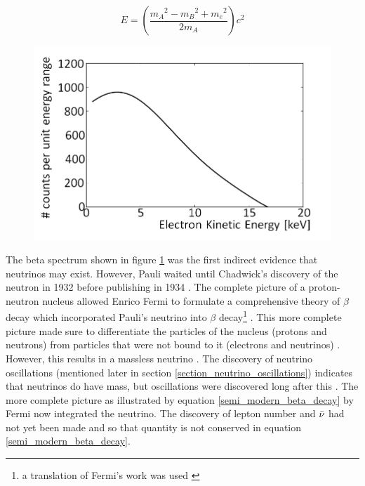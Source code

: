 \begin{equation}
    E = \left( \frac{{m_A}^2 - {m_B}^2 + {m_e}^2}{2m_A}\right) c^2
    \label{constant_ke_e_equation}
\end{equation}

\begin{figure}[!h]
 \centering
 \includegraphics[width=0.7\linewidth]{Chapter1/Figs/Raster/betaSpectrum.png}
 \label{fig:beta_spectrum}
\end{figure}

The beta spectrum shown in figure \ref{fig:beta_spectrum} was the first indirect evidence that neutrinos may exist. However, Pauli waited until Chadwick's discovery of the neutron in 1932 \cite{chadwick1932possible} before publishing in 1934 \cite{lederman1970resource}. The complete picture of a proton-neutron nucleus allowed Enrico Fermi to formulate a comprehensive theory of $\beta$ decay which incorporated Pauli's neutrino into $\beta$ decay\footnote{a translation of Fermi's work was used \cite{wilson1968fermi}} \cite{lederman1970resource} \cite{Fermi:1934hr}. This more complete picture made sure to differentiate the particles of the nucleus (protons and neutrons) from particles that were not bound to it (electrons and neutrinos) \cite{Fermi:1934hr} \cite{wilson1968fermi}. However, this results in a massless neutrino \cite{lederman1970resource}. The discovery of neutrino oscillations (mentioned later in section \ref{section_neutrino_oscillations}) indicates that neutrinos do have mass, but oscillations were discovered long after this  \cite{griffiths2008neutrino1.5}. The more complete picture as illustrated by equation \ref{semi_modern_beta_decay} by Fermi now integrated the neutrino. The discovery of lepton number and $\Bar{\nu}$ had not yet been made and so that quantity is not conserved in equation \ref{semi_modern_beta_decay}. 

